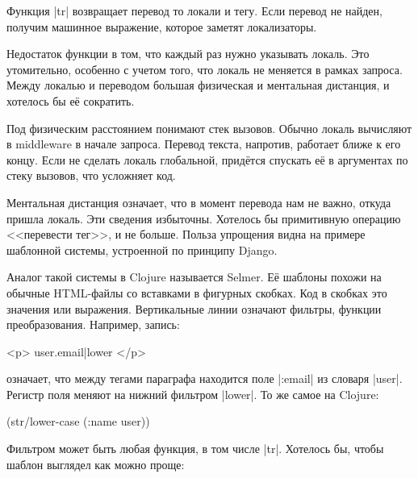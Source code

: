 
Функция \spverb|tr| возвращает перевод то локали и тегу. Если перевод не найден,
получим машинное выражение, которое заметят локализаторы.

Недостаток функции в том, что каждый раз нужно указывать локаль. Это
утомительно, особенно с учетом того, что локаль не меняется в рамках
запроса. Между локалью и переводом большая физическая и ментальная
дистанция, и хотелось бы е\"{е} сократить.


Под физическим расстоянием понимают стек вызовов. Обычно локаль вычисляют в
middleware в начале запроса. Перевод текста, напротив, работает ближе к его
концу. Если не сделать локаль глобальной, прид\"{е}тся спускать е\"{е} в аргументах по
стеку вызовов, что усложняет код.


Ментальная дистанция означает, что в момент перевода нам не важно, откуда пришла
локаль. Эти сведения избыточны. Хотелось бы примитивную операцию <<перевести
тег>>, и не больше. Польза упрощения видна на примере шаблонной системы,
устроенной по принципу Django.


Аналог такой системы в Clojure называется
Selmer. Е\"{е} шаблоны похожи на
обычные HTML-файлы со вставками в фигурных скобках. Код в скобках это значения
или выражения. Вертикальные линии означают фильтры, функции
преобразования. Например, запись:

\begin{english}
  \begin{htmldjango}
<p>{{ user.email|lower }}</p>
  \end{htmldjango}
\end{english}

\noindent
означает, что между тегами параграфа находится поле \spverb|:email| из словаря
\spverb|user|. Регистр поля меняют на нижний фильтром \spverb|lower|. То же
самое на Clojure:

\begin{english}
  \begin{clojure}
(str/lower-case (:name user))
  \end{clojure}
\end{english}

Фильтром может быть любая функция, в том числе \spverb|tr|. Хотелось бы,
чтобы шаблон выглядел как можно проще:

